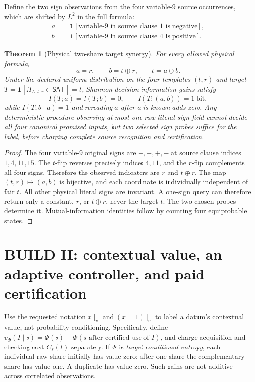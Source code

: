 \documentclass[11pt]{article}
\newtheorem{theorem}{Theorem}
\newcommand{\SAT}{\mathsf{SAT}}
\begin{document}
Define the two sign observations from the four variable-$9$ source occurrences, which are shifted by $L^2$ in the full formula:
\[
 \begin{aligned}
 a&=\mathbf 1[\text{variable-9 in source clause 1 is negative}],\\
 b&=\mathbf 1[\text{variable-9 in source clause 4 is positive}].
 \end{aligned}
\]
\begin{theorem}[Physical two-share target synergy]\label{th:shares}
For every allowed physical formula,
\[
\boxed{a=r,\qquad b=t\oplus r,\qquad t=a\oplus b.}
\]
Under the \emph{declared} uniform distribution on the four templates $(t,r)$ and target $T=\mathbf 1[H_{L,t,r}\in\SAT]=t$, Shannon decision-information gains satisfy
\[
I(T;a)=I(T;b)=0,\qquad I(T;(a,b))=1\text{ bit},
\]
while $I(T;b\mid a)=1$ and rereading $a$ after $a$ is known adds zero. Any deterministic procedure observing at most one raw literal-sign field cannot decide all four canonical promised inputs, but two selected sign probes suffice for the label, \emph{before charging complete source recognition and certification}.
\end{theorem}
\begin{proof}
The four variable-$9$ original signs are $+,-,+,-$ at source clause indices $1,4,11,15$. The $t$-flip reverses precisely indices $4,11$, and the $r$-flip complements all four signs. Therefore the observed indicators are $r$ and $t\oplus r$. The map $(t,r)\mapsto(a,b)$ is bijective, and each coordinate is individually independent of fair $t$. All other physical literal signs are invariant. A one-sign query can therefore return only a constant, $r$, or $t\oplus r$, never the target $t$. The two chosen probes determine it. Mutual-information identities follow by counting four equiprobable states.
\end{proof}

\section{BUILD II: contextual value, an adaptive controller, and paid certification}
Use the requested notation $x\mid_v$ and $(x=1)\mid_v$ to label a datum's contextual value, not probability conditioning. Specifically, define $v_\Phi(I\mid s)=\Phi(s)-\Phi(s\text{ after certified use of }I)$, and charge acquisition and checking cost $C_s(I)$ separately. If $\Phi$ is \emph{target conditional entropy}, each individual raw share initially has value zero; after one share the complementary share has value one. A duplicate has value zero. Such gains are not additive across correlated observations.
\end{document}
